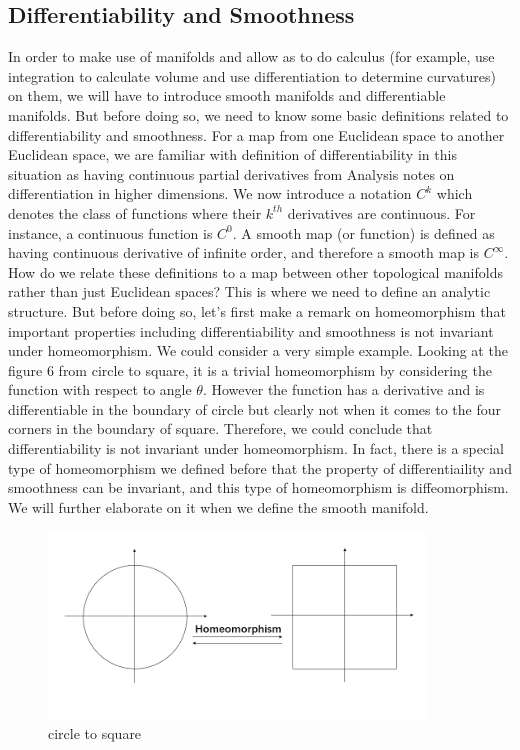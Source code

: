 \documentclass[12pt,twoside]{article}
\begin{document}
\subsection{Differentiability and Smoothness}
In order to make use of manifolds and allow as to do calculus (for example, use integration to calculate volume and use differentiation to determine curvatures) on them, we will have to introduce smooth manifolds and differentiable manifolds. But before doing so, we need to know some basic definitions related to differentiability and smoothness. For a map from one Euclidean space to another Euclidean space, we are familiar with definition of differentiability in this situation as having continuous partial derivatives from Analysis notes on differentiation in higher dimensions. We now introduce a notation $C^{k}$ which denotes the class of functions where their $k^{th}$ derivatives are continuous. For instance, a continuous function is $C^{0}$. A smooth map (or function) is defined as having continuous derivative of infinite order, and therefore a smooth map is $C^{\infty}$. How do we relate these definitions to a map between other topological manifolds rather than just Euclidean spaces? This is where we need to define an analytic structure. But before doing so, let's first make a remark on homeomorphism that important properties including differentiability and smoothness is not invariant under homeomorphism. We could consider a very simple example. Looking at the figure 6 from circle to square, it is a trivial homeomorphism by considering the function with respect to angle $\theta$. However the function has a derivative and is differentiable in the boundary of circle but clearly not when it comes to the four corners in the boundary of square. Therefore, we could conclude that differentiability is not invariant under homeomorphism. In fact, there is a special type of homeomorphism we defined before that the property of differentiaility and smoothness can be invariant, and this type of homeomorphism is diffeomorphism. We will further elaborate on it when we define the smooth manifold.
\begin{figure}[tb]
\centering
\includegraphics[width=100mm]{circle versus square.png} 
\caption{circle to square}
\end{figure}
\end{document}
